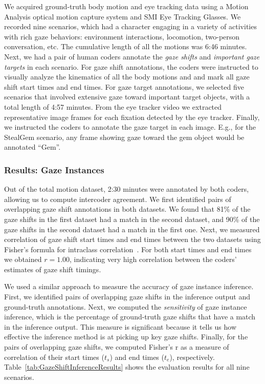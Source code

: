 We acquired ground-truth body motion and eye tracking data using a Motion Analysis optical motion capture system and SMI Eye Tracking Glasses. We recorded nine scenarios, which had a character engaging in a variety of activities with rich gaze behaviors: environment interactions, locomotion, two-person conversation, etc. The cumulative length of all the motions was 6:46 minutes. Next, we had a pair of human coders annotate the \emph{gaze shifts} and \emph{important gaze targets} in each scenario. For gaze shift annotations, the coders were instructed to visually analyze the kinematics of all the body motions and and mark all gaze shift start times and end times. For gaze target annotations, we selected five scenarios that involved extensive gaze toward important target objects, with a total length of 4:57 minutes. From the eye tracker video we extracted representative image frames for each fixation detected by the eye tracker. Finally, we instructed the coders to annotate the gaze target in each image. E.g., for the StealGem scenario, any frame showing gaze toward the gem object would be annotated ``Gem''.

\subsubsection{Results: Gaze Instances}

Out of the total motion dataset, 2:30 minutes were annotated by both coders, allowing us to compute intercoder agreement. We first identified pairs of overlapping gaze shift annotations in both datasets. We found that 81\% of the gaze shifts in the first dataset had a match in the second dataset, and 90\% of the gaze shifts in the second dataset had a match in the first one. Next, we measured correlation of gaze shift start times and end times between the two datasets using Fisher's formula for intraclass correlation~\citep{fisher1925statistical}. For both start times and end times we obtained $r = 1.00$, indicating very high correlation between the coders' estimates of gaze shift timings.

We used a similar approach to measure the accuracy of gaze instance inference. First, we identified pairs of overlapping gaze shifts in the inference output and ground-truth annotations. Next, we computed the \emph{sensitivity} of gaze instance inference, which is the percentage of ground-truth gaze shifts that have a match in the inference output. This measure is significant because it tells us how effective the inference method is at picking up key gaze shifts. Finally, for the pairs of overlapping gaze shifts, we computed Fisher's r as a measure of correlation of their start times ($t_s$) and end times ($t_e$), respectively. Table~\ref{tab:GazeShiftInferenceResults} shows the evaluation results for all nine scenarios.

